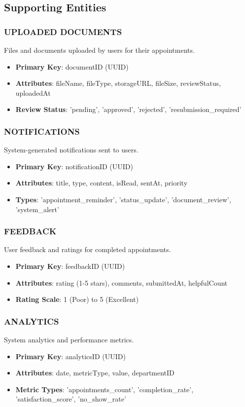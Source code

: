 \documentclass[12pt,a4paper]{article}
\begin{document}
\subsection{Supporting Entities}

\subsubsection{UPLOADED DOCUMENTS}
Files and documents uploaded by users for their appointments.
\begin{itemize}[leftmargin=*]
    \item \textbf{Primary Key}: documentID (UUID)
    \item \textbf{Attributes}: fileName, fileType, storageURL, fileSize, reviewStatus, uploadedAt
    \item \textbf{Review Status}: 'pending', 'approved', 'rejected', 'resubmission_required'
\end{itemize}

\subsubsection{NOTIFICATIONS}
System-generated notifications sent to users.
\begin{itemize}[leftmargin=*]
    \item \textbf{Primary Key}: notificationID (UUID)
    \item \textbf{Attributes}: title, type, content, isRead, sentAt, priority
    \item \textbf{Types}: 'appointment_reminder', 'status_update', 'document_review', 'system_alert'
\end{itemize}

\subsubsection{FEEDBACK}
User feedback and ratings for completed appointments.
\begin{itemize}[leftmargin=*]
    \item \textbf{Primary Key}: feedbackID (UUID)
    \item \textbf{Attributes}: rating (1-5 stars), comments, submittedAt, helpfulCount
    \item \textbf{Rating Scale}: 1 (Poor) to 5 (Excellent)
\end{itemize}

\subsubsection{ANALYTICS}
System analytics and performance metrics.
\begin{itemize}[leftmargin=*]
    \item \textbf{Primary Key}: analyticsID (UUID)
    \item \textbf{Attributes}: date, metricType, value, departmentID
    \item \textbf{Metric Types}: 'appointments_count', 'completion_rate', 'satisfaction_score', 'no_show_rate'
\end{itemize}
\end{document}
